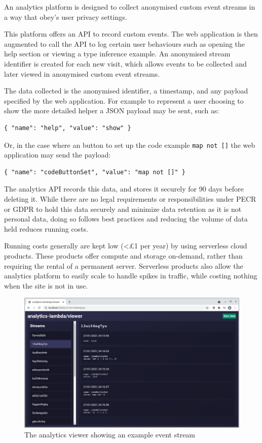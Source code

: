 \documentclass[a4paper,fleqn,oneside,12pt]{report}
\begin{document}
An analytics platform is designed to collect anonymised custom event streams in a way that obey's user privacy settings.

This platform offers an API to record custom events. The web application is then augmented to call the API to log certain user behaviours such as opening the help section or viewing a type inference example. An anonymised stream identifier is created for each new visit, which allows events to be collected and later viewed in anonymised custom event streams.

The data collected is the anonymised identifier, a timestamp, and any payload specified by the web application. For example to represent a user choosing to show the more detailed helper a JSON payload may be sent, such as:

\begin{verbatim}
{ "name": "help", "value": "show" }
\end{verbatim}
Or, in the case where an button to set up the code example \texttt{map not []} the web application may send the payload: 

\begin{verbatim}
{ "name": "codeButtonSet", "value": "map not []" }
\end{verbatim}
The analytics API records this data, and stores it securely for 90 days before deleting it. While there are no legal requirements or responsibilities under PECR or GDPR to hold this data securely and minimize data retention as it is not personal data, doing so follows best practices and reducing the volume of data held reduces running costs.

Running costs generally are kept low (<£1 per year) by using serverless cloud products. These products offer compute and storage on-demand, rather than requiring the rental of a permanent server. Serverless products also allow the analytics platform to easily scale to handle spikes in traffic, while costing nothing when the site is not in use.

\begin{figure}[h!]
  \centering
  \includegraphics[width=1.000\linewidth]{images/image16.png}
  \caption{The analytics viewer showing an example event stream}
\end{figure}
\end{document}
